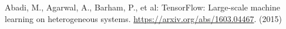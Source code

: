 \documentclass{llncs}
\begin{document}
\begin{thebibliography}{8}
    
    Abadi, M., Agarwal, A., Barham, P., et al: TensorFlow: Large-scale machine learning on heterogeneous systems. 
    \url{https://arxiv.org/abs/1603.04467}. 
    (2015)
    
    
    
    
\end{thebibliography}
\end{document}
